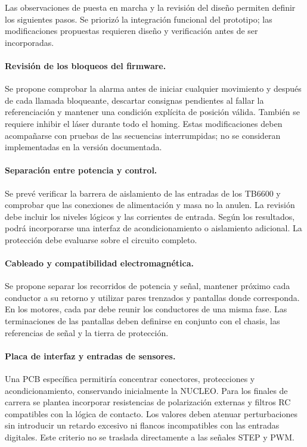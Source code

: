 \documentclass[blue,fullpaper]{ludusofficial}  %
\begin{document}
Las observaciones de puesta en marcha y la revisión
del diseño permiten definir los siguientes pasos.
Se priorizó la integración funcional del prototipo;
las modificaciones propuestas requieren diseño
y verificación antes de ser incorporadas.

\paragraph{Revisión de los bloqueos del firmware.}
Se propone comprobar la alarma antes de iniciar
cualquier movimiento y después de cada llamada
bloqueante, descartar consignas pendientes al fallar
la referenciación y mantener una condición explícita
de posición válida. También se requiere inhibir
el láser durante todo el homing. Estas modificaciones
deben acompañarse con pruebas de las secuencias
interrumpidas; no se consideran implementadas
en la versión documentada.

\paragraph{Separación entre potencia y control.}
Se prevé verificar la barrera de aislamiento de las
entradas de los TB6600 y comprobar que las conexiones
de alimentación y masa no la anulen. La revisión debe
incluir los niveles lógicos y las corrientes de entrada.
Según los resultados, podrá incorporarse una interfaz
de acondicionamiento o aislamiento adicional.
La protección debe evaluarse sobre el circuito completo.

\paragraph{Cableado y compatibilidad electromagnética.}
Se propone separar los recorridos de potencia y señal,
mantener próximo cada conductor a su retorno y utilizar
pares trenzados y pantallas donde corresponda.
En los motores, cada par debe reunir los conductores
de una misma fase. Las terminaciones de las pantallas
deben definirse en conjunto con el chasis, las referencias
de señal y la tierra de protección.

\paragraph{Placa de interfaz y entradas de sensores.}
Una PCB específica permitiría concentrar conectores,
protecciones y acondicionamiento, conservando inicialmente
la NUCLEO. Para los finales de carrera se plantea
incorporar resistencias de polarización externas
y filtros RC compatibles con la lógica de contacto.
Los valores deben atenuar perturbaciones sin introducir
un retardo excesivo ni flancos incompatibles con las
entradas digitales. Este criterio no se traslada
directamente a las señales STEP y PWM.
\end{document}
